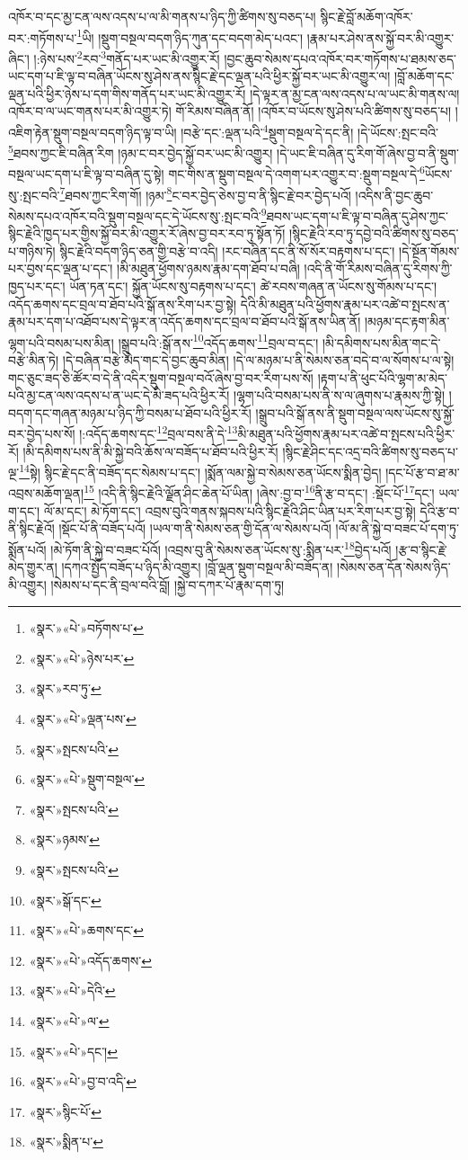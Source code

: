 འཁོར་བ་དང་མྱ་ངན་ལས་འདས་པ་ལ་མི་གནས་པ་ཉིད་ཀྱི་ཚིགས་སུ་བཅད་པ། སྙིང་རྗེ་བློ་མཆོག་འཁོར་བར་:གཏོགས་པ་\footnote{«སྣར་»«པེ་»བཏོགས་པ་}ཡི། །སྡུག་བསྔལ་བདག་ཉིད་ཀུན་དང་བདག་མེད་པའང་། །རྣམ་པར་ཤེས་ནས་སྐྱོ་བར་མི་འགྱུར་ཞིང་། །:ཉེས་པས་\footnote{«སྣར་»«པེ་»ཉེས་པར་}རབ་\footnote{«སྣར་»རབ་ཏུ་}གནོད་པར་ཡང་མི་འགྱུར་རོ། །བྱང་ཆུབ་སེམས་དཔའ་འཁོར་བར་གཏོགས་པ་ཐམས་ཅད་ཡང་དག་པ་ཇི་ལྟ་བ་བཞིན་ཡོངས་སུ་ཤེས་ནས་སྙིང་རྗེ་དང་ལྡན་པའི་ཕྱིར་སྐྱོ་བར་ཡང་མི་འགྱུར་ལ། །བློ་མཆོག་དང་ལྡན་པའི་ཕྱིར་ཉེས་པ་དག་གིས་གནོད་པར་ཡང་མི་འགྱུར་རོ། །དེ་ལྟར་ན་མྱ་ངན་ལས་འདས་པ་ལ་ཡང་མི་གནས་ལ། འཁོར་བ་ལ་ཡང་གནས་པར་མི་འགྱུར་ཏེ། གོ་རིམས་བཞིན་ནོ། །འཁོར་བ་ཡོངས་སུ་ཤེས་པའི་ཚིགས་སུ་བཅད་པ། །འཇིག་རྟེན་སྡུག་བསྔལ་བདག་ཉིད་ལྟ་བ་ཡི། །བརྩེ་དང་:ལྡན་པའི་\footnote{«སྣར་»«པེ་»ལྡན་པས་}སྡུག་བསྔལ་དེ་དང་ནི། །དེ་ཡོངས་:སྤང་བའི་\footnote{«སྣར་»སྤངས་པའི་}ཐབས་ཀྱང་ཇི་བཞིན་རིག །ཉམ་ང་བར་བྱེད་སྐྱོ་བར་ཡང་མི་འགྱུར། །དེ་ཡང་ཇི་བཞིན་དུ་རིག་གོ་ཞེས་བྱ་བ་ནི་སྡུག་བསྔལ་ཡང་དག་པ་ཇི་ལྟ་བ་བཞིན་དུ་སྟེ། གང་གིས་ན་སྡུག་བསྔལ་དེ་འགག་པར་འགྱུར་བ་:སྡུག་བསྔལ་དེ་\footnote{«སྣར་»«པེ་»སྡུག་བསྔལ་}ཡོངས་སུ་:སྤང་བའི་\footnote{«སྣར་»སྤངས་པའི་}ཐབས་ཀྱང་རིག་གོ། །ཉམ་\footnote{«སྣར་»ཉམས་}ང་བར་བྱེད་ཅེས་བྱ་བ་ནི་སྙིང་རྗེ་བར་བྱེད་པའོ། །འདིས་ནི་བྱང་ཆུབ་སེམས་དཔའ་འཁོར་བའི་སྡུག་བསྔལ་དང་དེ་ཡོངས་སུ་:སྤང་བའི་\footnote{«སྣར་»སྤངས་པའི་}ཐབས་ཡང་དག་པ་ཇི་ལྟ་བ་བཞིན་དུ་ཤེས་ཀྱང་སྙིང་རྗེའི་ཁྱད་པར་གྱིས་སྐྱོ་བར་མི་འགྱུར་རོ་ཞེས་བྱ་བར་རབ་ཏུ་སྟོན་ཏོ། །སྙིང་རྗེའི་རབ་ཏུ་དབྱེ་བའི་ཚིགས་སུ་བཅད་པ་གཉིས་ཏེ། སྙིང་རྗེའི་བདག་ཉིད་ཅན་གྱི་བརྩེ་བ་འདི། །རང་བཞིན་དང་ནི་སོ་སོར་བརྟགས་པ་དང་། །དེ་སྔོན་གོམས་པར་བྱས་དང་ལྡན་པ་དང་། །མི་མཐུན་ཕྱོགས་ཉམས་རྣམ་དག་ཐོབ་པ་བཞི། །འདི་ནི་གོ་རིམས་བཞིན་དུ་རིགས་ཀྱི་ཁྱད་པར་དང་། ཡོན་ཏན་དང་། སྐྱོན་ཡོངས་སུ་བརྟགས་པ་དང་། ཚེ་རབས་གཞན་ན་ཡོངས་སུ་གོམས་པ་དང་། འདོད་ཆགས་དང་བྲལ་བ་ཐོབ་པའི་སྒོ་ནས་རིག་པར་བྱ་སྟེ། དེའི་མི་མཐུན་པའི་ཕྱོགས་རྣམ་པར་འཚེ་བ་སྤངས་ན་རྣམ་པར་དག་པ་འཐོབ་པས་དེ་ལྟར་ན་འདོད་ཆགས་དང་བྲལ་བ་ཐོབ་པའི་སྒོ་ནས་ཡིན་ནོ། །མཉམ་དང་རྟག་མིན་ལྷག་པའི་བསམ་པས་མིན། །སྒྲུབ་པའི་:སྒོ་ནས་\footnote{«སྣར་»སྒོ་དང་}འདོད་ཆགས་\footnote{«སྣར་»«པེ་»ཆགས་དང་}བྲལ་བ་དང་། །མི་དམིགས་པས་མིན་གང་དེ་བརྩེ་མིན་ཏེ། །དེ་བཞིན་བརྩེ་མེད་གང་དེ་བྱང་ཆུབ་མིན། །དེ་ལ་མཉམ་པ་ནི་སེམས་ཅན་བདེ་བ་ལ་སོགས་པ་ལ་སྟེ། གང་ཅུང་ཟད་ཅི་ཚོར་བ་དེ་ནི་འདིར་སྡུག་བསྔལ་བའོ་ཞེས་བྱ་བར་རིག་པས་སོ། །རྟག་པ་ནི་ཕུང་པོའི་ལྷག་མ་མེད་པའི་མྱ་ངན་ལས་འདས་པ་ན་ཡང་དེ་མི་ཟད་པའི་ཕྱིར་རོ། །ལྷག་པའི་བསམ་པས་ནི་ས་ལ་ཞུགས་པ་རྣམས་ཀྱི་སྟེ། །བདག་དང་གཞན་མཉམ་པ་ཉིད་ཀྱི་བསམ་པ་ཐོབ་པའི་ཕྱིར་རོ། །སྒྲུབ་པའི་སྒོ་ནས་ནི་སྡུག་བསྔལ་ལས་ཡོངས་སུ་སྐྱོ་བར་བྱེད་པས་སོ། །:འདོད་ཆགས་དང་\footnote{«སྣར་»«པེ་»འདོད་ཆགས་}བྲལ་བས་ནི་དེ་\footnote{«སྣར་»«པེ་»དེའི་}མི་མཐུན་པའི་ཕྱོགས་རྣམ་པར་འཚེ་བ་སྤངས་པའི་ཕྱིར་རོ། །མི་དམིགས་པས་ནི་མི་སྐྱེ་བའི་ཆོས་ལ་བཟོད་པ་ཐོབ་པའི་ཕྱིར་རོ། །སྙིང་རྗེ་ཤིང་དང་འདྲ་བའི་ཚིགས་སུ་བཅད་པ་ལྔ་\footnote{«སྣར་»«པེ་»ལ་}སྟེ། སྙིང་རྗེ་དང་ནི་བཟོད་དང་སེམས་པ་དང་། །སྨོན་ལམ་སྐྱེ་བ་སེམས་ཅན་ཡོངས་སྨིན་བྱེད། །དང་པོ་རྩ་བ་ཐ་མ་འབྲས་མཆོག་ལྡན།\footnote{«སྣར་»«པེ་»དང་།} །འདི་ནི་སྙིང་རྗེའི་ལྗོན་ཤིང་ཆེན་པོ་ཡིན། །ཞེས་:བྱ་བ་\footnote{«སྣར་»«པེ་»བྱ་བ་འདི་}ནི་རྩ་བ་དང་། :སྡོང་པོ་\footnote{«སྣར་»སྙིང་པོ་}དང་། ཡལ་ག་དང་། ལོ་མ་དང་། མེ་ཏོག་དང་། འབྲས་བུའི་གནས་སྐབས་པའི་སྙིང་རྗེའི་ཤིང་ཡིན་པར་རིག་པར་བྱ་སྟེ། དེའི་རྩ་བ་ནི་སྙིང་རྗེའོ། །སྡོང་པོ་ནི་བཟོད་པའོ། །ཡལ་ག་ནི་སེམས་ཅན་གྱི་དོན་ལ་སེམས་པའོ། །ལོ་མ་ནི་སྐྱེ་བ་བཟང་པོ་དག་ཏུ་སྨོན་པའོ། །མེ་ཏོག་ནི་སྐྱེ་བ་བཟང་པོའོ། །འབྲས་བུ་ནི་སེམས་ཅན་ཡོངས་སུ་:སྨིན་པར་\footnote{«སྣར་»སྨིན་པ་}བྱེད་པའོ། །རྩ་བ་སྙིང་རྗེ་མེད་གྱུར་ན། །དཀའ་སྤྱོད་བཟོད་པ་ཉིད་མི་འགྱུར། །བློ་ལྡན་སྡུག་བསྔལ་མི་བཟོད་ན། །སེམས་ཅན་དོན་སེམས་ཉིད་མི་འགྱུར། །སེམས་པ་དང་ནི་བྲལ་བའི་བློ། །སྐྱེ་བ་དཀར་པོ་རྣམ་དག་ཏུ། 